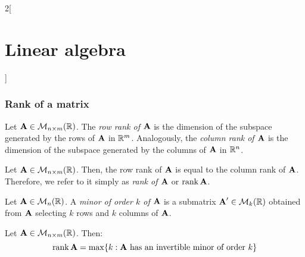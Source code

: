 \documentclass[../../../main.tex]{subfiles}
\begin{document}
\begin{multicols}{2}[\section{Linear algebra}]
  \subsubsection{Rank of a matrix}
  \begin{definition}
    Let $\boldsymbol{\mathrm{A}}\in\mathcal{M}_{n\times m}(\mathbb{R})$. The \textit{row rank of $\boldsymbol{\mathrm{A}}$} is the dimension of the subspace generated by the rows of $\boldsymbol{\mathrm{A}}$ in $\mathbb{R}^m$. Analogously, the \textit{column rank of $\boldsymbol{\mathrm{A}}$} is the dimension of the subspace generated by the columns of $\boldsymbol{\mathrm{A}}$ in $\mathbb{R}^n$.
  \end{definition}
  \begin{prop}
    Let $\boldsymbol{\mathrm{A}}\in\mathcal{M}_{n\times m}(\mathbb{R})$. Then, the row rank of $\boldsymbol{\mathrm{A}}$ is equal to the column rank of $\boldsymbol{\mathrm{A}}$. Therefore, we refer to it simply as \textit{rank of $\boldsymbol{\mathrm{A}}$} or $\rank\boldsymbol{\mathrm{A}}$.
  \end{prop}
  \begin{definition}
    Let $\boldsymbol{\mathrm{A}}\in\mathcal{M}_n(\mathbb{R})$. A \textit{minor of order $k$ of $\boldsymbol{\mathrm{A}}$} is a submatrix $\boldsymbol{\mathrm{A}}'\in\mathcal{M}_k(\mathbb{R})$ obtained from $\boldsymbol{\mathrm{A}}$ selecting $k$ rows and $k$ columns of $\boldsymbol{\mathrm{A}}$.
  \end{definition}
  \begin{prop}
    Let $\boldsymbol{\mathrm{A}}\in\mathcal{M}_{n\times m}(\mathbb{R})$. Then:
    $$\rank\vectorfunction{A}=\max\{k:\text{$\vectorfunction{A}$\ has an invertible minor of order $k$}\}$$
  \end{prop}

\end{multicols}
\end{document}
